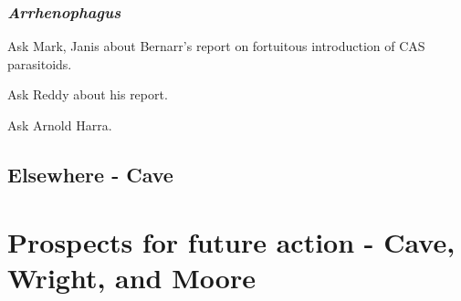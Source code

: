 \documentclass[12pt,letterpaper,english,bibliography=totocnumbered, abstract=on]{scrartcl}
\begin{document}
\subsubsection{\textit{Arrhenophagus}}  

Ask Mark, Janis about Bernarr's report on fortuitous introduction of CAS parasitoids.

Ask Reddy about his report.

Ask Arnold Harra.


\subsection{Elsewhere - Cave}

\section{Prospects for future action - Cave, Wright, and Moore}

\newpage
\printbibliography[heading=bibintoc]
\end{document}
